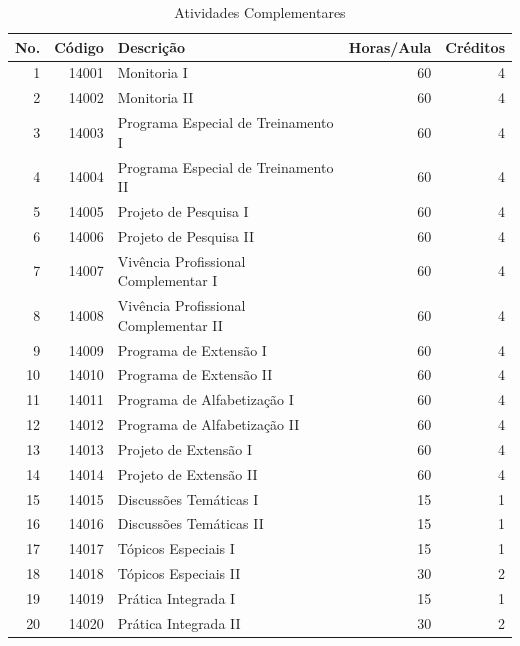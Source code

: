 \documentclass[
	12pt,				%
	openright,			%
  oneside,     %
	a4paper,			%
	english,			%
	french,				%
	spanish,			%
	brazil				%
	]{abntex2}
\begin{document}
\newpage
    \begin{longtable}{r|r|l|r|r}
      \caption{Atividades Complementares}
      \label{tab:atividadescomplementares}%
      \\
\hline
    \textbf{No.} & \textbf{Código} & \textbf{Descrição} & \textbf{Horas/Aula} & \textbf{Créditos} \\
    \hline
    1     & 14001 & Monitoria I & 60    & 4 \\     \hline
    2     & 14002 & Monitoria II & 60    & 4 \\     \hline
    3     & 14003 & Programa Especial de Treinamento I & 60    & 4 \\     \hline
    4     & 14004 & Programa Especial de Treinamento II & 60    & 4 \\     \hline
    5     & 14005 & Projeto de Pesquisa I & 60    & 4 \\     \hline
    6     & 14006 & Projeto de Pesquisa II & 60    & 4 \\     \hline
    7     & 14007 & Vivência Profissional Complementar I & 60    & 4 \\    \hline
    8     & 14008 & Vivência Profissional Complementar II & 60    & 4 \\    \hline
    9     & 14009 & Programa de Extensão I & 60    & 4 \\    \hline
    10    & 14010 & Programa de Extensão II & 60    & 4 \\    \hline
    11    & 14011 & Programa de Alfabetização I & 60    & 4 \\    \hline
    12    & 14012 & Programa de Alfabetização II & 60    & 4 \\    \hline
    13    & 14013 & Projeto de Extensão I & 60    & 4 \\    \hline
    14    & 14014 & Projeto de Extensão II & 60    & 4 \\    \hline
    15    & 14015 & Discussões Temáticas I & 15    & 1 \\    \hline
    16    & 14016 & Discussões Temáticas II & 15    & 1 \\    \hline
    17    & 14017 & Tópicos Especiais I & 15    & 1 \\    \hline
    18    & 14018 & Tópicos Especiais II & 30    & 2 \\    \hline
    19    & 14019 & Prática Integrada I & 15    & 1 \\    \hline
    20    & 14020 & Prática Integrada II & 30    & 2 \\    \hline

\end{longtable}
\end{document}
